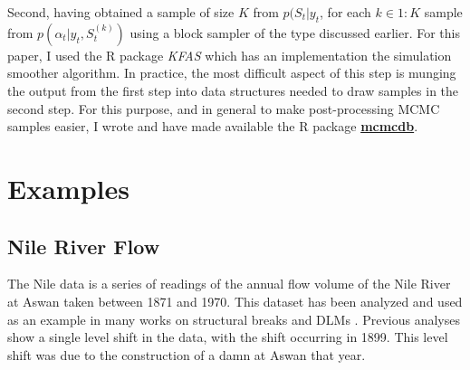 \documentclass{article}
\newcommand{\RLang}{\textsf{R}}
\begin{document}
Second, having obtained a sample of size $K$ from $p(S_{t} | y_{t}$, for each $k \in 1:K$ sample from $p(\alpha_{t} | y_{t}, S_{t}^{(k)})$ using a block sampler of the type discussed earlier.
For this paper, I used the R package \textit{KFAS} \parencite{Helske2012} which has an implementation the \textcite{DurbinKoopman2002} simulation smoother algorithm.
In practice, the most difficult aspect of this step is munging the output from the first step into data structures needed to draw samples in the second step.
For this purpose, and in general to make post-processing MCMC samples easier, I wrote and have made available the \RLang{} package \href{https://github.com/jrnold/mcmcdb}{\textbf{mcmcdb}}.

\section{Examples}
\label{sec:examples}


\subsection{Nile River Flow}
\label{sec:nile}

The Nile data is a series of readings of the annual flow volume of the Nile River at Aswan taken between 1871 and 1970.
This dataset has been analyzed and used as an example in many works on structural breaks and DLMs \parencites{Cobb1978}{Balke1993}{JongPenzer1998}{DurbinKoopman2001}{DurbinKoopman2012}.
Previous analyses show a single level shift in the data, with the shift occurring in 1899.
This level shift was due to the construction of a damn at Aswan that year.
\end{document}
